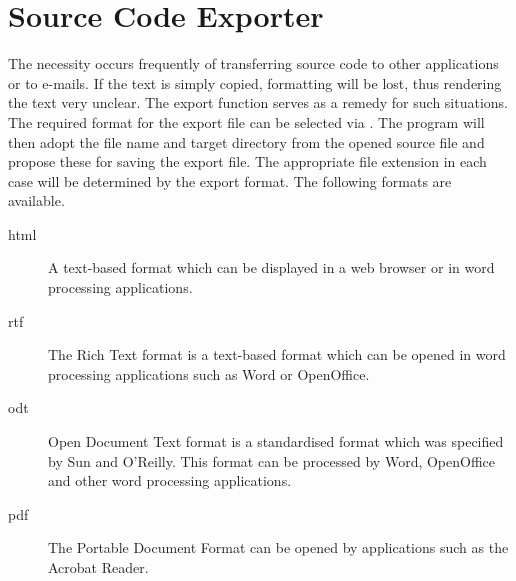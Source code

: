 \section{Source Code Exporter}\label{sec:src_exporter}

The necessity occurs frequently of transferring source code to other applications or to e-mails. If the text is simply copied, formatting will be lost, thus rendering the text very unclear.
The \codeblocks export function serves as a remedy for such situations. The required format for the export file can be selected via . The program will then adopt the file name and target directory from the opened source file and propose these for saving the export file. The appropriate file extension in each case will be determined by the export format. The following formats are available.

\begin{description}
\item[html] A text-based format which can be displayed in a web browser or in word processing applications.
\item[rtf] The Rich Text format is a text-based format which can be opened in word processing applications such as Word or OpenOffice.
\item[odt] Open Document Text format is a standardised format which was specified by Sun and O'Reilly. This format can be processed by Word, OpenOffice and other word processing applications.
\item[pdf] The Portable Document Format can be opened by applications such as the Acrobat Reader.
\end{description}
